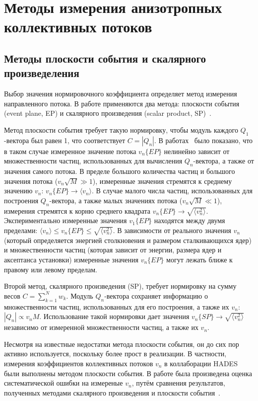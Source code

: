 \section{Методы измерения анизотропных коллективных потоков}

\subsection{Методы плоскости события и скалярного произведеления}

Выбор значения нормировочного коэффициента определяет метод измерения направленного потока. 
В работе применяются два метода: плоскости события (event plane, EP) и скалярного произведения (scalar product, SP)~\cite{Mamaev:2020lpi}. 

Метод плоскости события требует такую нормировку, чтобы модуль каждого $Q_1$-вектора был равен 1, что соответствует $C=|Q_n|$. 
В работах~\cite{Borghini:2001vi, Bhalerao:2006tp} было показано, что в таком случае измеренное значение потока $v_n\{EP\}$ нелинейно зависит от множественности частиц, использованных для вычисления $Q_n$-вектора, а также от значения самого потока. 
В пределе большого количества частиц и большого значения потока ($v_n \sqrt{M} \gg 1$), измеренные значения стремятся к среднему значению $v_n$: $v_n\{EP\} \xrightarrow{} \langle v_n \rangle$. 
В случае малого числа частиц, использованных для построения $Q_n$-вектора, а также малых значениях потока ($v_n \sqrt{M} \ll 1$), измерения стремятся к корню среднего квадрата $ v_n\{EP\} \xrightarrow{} \sqrt{ \langle v_n^2 \rangle }$.
Экспериментально измеренные значения $v_1\{EP\}$ находятся между двумя пределами: $ \langle v_n \rangle \leq v_n\{EP\} \leq \sqrt{ \langle v_n^2 \rangle } $.
В зависимости от реального значения $v_n$ (который определяется энергией столкновения и размером сталкивающихся ядер) и множественности частиц (которая зависит от энергии, размера ядер и аксептанса установки) измеренные значения $v_n\{EP\}$ могут лежать ближе к правому или левому пределам.

Второй метод, скалярного произведения (SP), требует нормировку на сумму весов $C=\sum_{k=1}^N w_k$.
Модуль $Q_n$-вектора сохраняет информацию о множественности частиц, использованных для его построения, а также их $v_n$: $|Q_n| \propto v_n M$.
Использование такой нормировки дает значения $v_n\{SP\} \xrightarrow{} \sqrt{\langle v_n^2 \rangle}$ независимо от измеренной множественности частиц, а также их $v_n$.

Несмотря на известные недостатки метода плоскости события, он до сих пор активно используется, поскольку более прост в реализации. 
В частности, измерения коэффициентов коллективных потоков $v_n$ в коллаборации HADES~\cite{HADES:2020lob} были выполнены методом плоскости события. 
В работе была произведена оценка систематической ошибки на измереные $v_n$, путём сравнения результатов, полученных методами скалярного произведения и плоскости события~\cite{Mamaev:2020lpi}.

